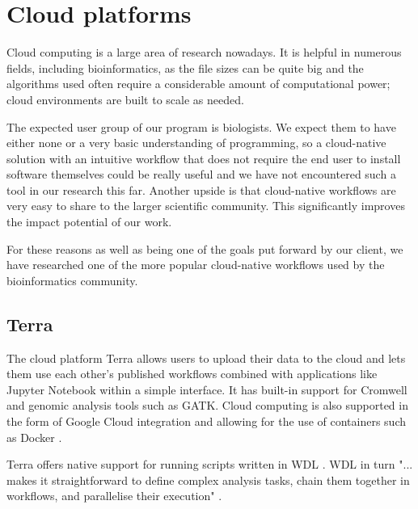 \documentclass{article}
\begin{document}


\section{Cloud platforms}
Cloud computing is a large area of research nowadays. It is helpful in numerous fields, including bioinformatics, as the file sizes can be quite big and the algorithms used often require a considerable amount of computational power; cloud environments are built to scale as needed.

The expected user group of our program is biologists. We expect them to have either none or a very basic understanding of programming, so a cloud-native solution with an intuitive workflow that does not require the end user to install software themselves could be really useful and we have not encountered such a tool in our research this far. Another upside is that cloud-native workflows are very easy to share to the larger scientific community. This significantly improves the impact potential of our work.

For these reasons as well as being one of the goals put forward by our client, we have researched one of the more popular cloud-native workflows used by the bioinformatics community.

\subsection{Terra}
The cloud platform Terra allows users to upload their data to the cloud and lets them use each other's published workflows combined with applications like Jupyter Notebook within a simple interface. It has built-in support for Cromwell and genomic analysis tools such as GATK. Cloud computing is also supported in the form of Google Cloud integration and allowing for the use of containers such as Docker \cite{terra.bio, broad-institute}.

Terra offers native support for running scripts written in WDL \cite{terra.bio}. WDL in turn "... makes it straightforward to define complex analysis tasks, chain them together in workflows, and parallelise their execution" \cite{wdl}.

\medskip
\printbibliography
\end{document}

